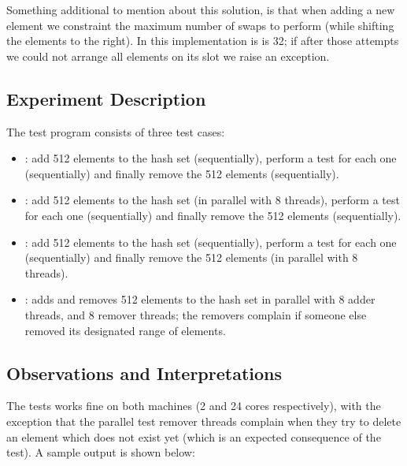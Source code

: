 Something additional to mention about this solution, is that when
adding a new element we constraint the maximum number of swaps to
perform (while shifting the elements to the right). In this
implementation is  is 32; if after those attempts we could
not arrange all elements on its slot we raise an exception.

\subsection{Experiment Description}
The test program consists of three test cases:

\begin{itemize}
  \item {}: add 512 elements to the hash set
    (sequentially), perform a  test for each one
    (sequentially) and finally remove the 512 elements
    (sequentially). \\ 
  \item {}: add 512 elements to the hash set
    (in parallel with 8 threads), perform a  test for each one
    (sequentially) and finally remove the 512 elements
    (sequentially). \\ 
  \item {}: add 512 elements to the hash set
    (sequentially), perform a  test for each one
    (sequentially) and finally remove the 512 elements
    (in parallel with 8 threads). \\
  \item {}: adds and removes 512 elements to the
    hash set in parallel with 8 adder threads, and 8 remover threads;
    the removers complain if someone else removed its designated range
    of elements.
\end{itemize}

\subsection{Observations and Interpretations}
The tests works fine on both machines (2 and 24 cores respectively),
with the exception that the parallel test remover threads complain
when they try to delete an element which does not exist yet (which is
an expected consequence of the test). A sample output is shown below:

